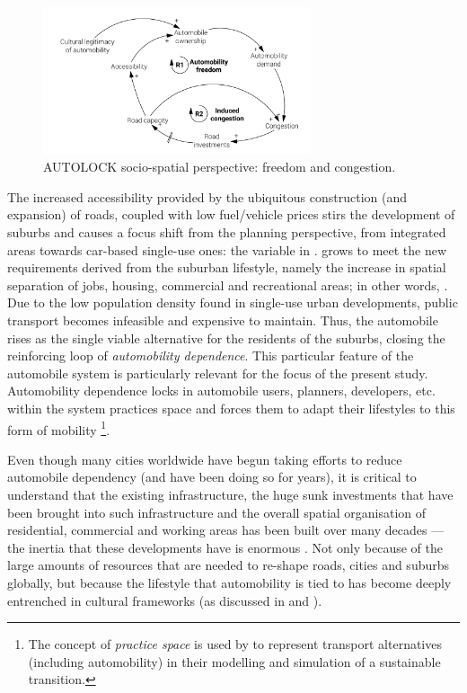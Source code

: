 \begin{figure}[h]
\centering
\includegraphics[width=0.7\textwidth]{figures/model/cropped/congestion-urban_1_core.pdf}
\caption{AUTOLOCK socio-spatial perspective: freedom and congestion.}
\label{f:results:cld_congestion_1}
\end{figure}

The increased accessibility provided by the ubiquitous construction (and expansion) of roads, coupled with low fuel/vehicle prices stirs the development of suburbs and causes a focus shift from the planning perspective, from integrated areas towards car-based single-use ones: the  variable in .  grows to meet the new requirements derived from the suburban lifestyle, namely the increase in spatial separation of jobs, housing, commercial and recreational areas; in other words, . Due to the low population density found in single-use urban developments, public transport becomes infeasible and expensive to maintain. Thus, the automobile rises as the single viable alternative for the residents of the suburbs, closing the  reinforcing loop of \emph{automobility dependence}. This particular feature of the automobile system is particularly relevant for the focus of the present study. Automobility dependence locks in automobile users, planners, developers, etc. within the system practices space and forces them to adapt their lifestyles to this form of mobility \parencite{cullinane2003_Cardependencepublic,koehler2009_transitionsmodelsustainable}\footnote{The concept of \emph{practice space} is used by \textcite{koehler2009_transitionsmodelsustainable} to represent transport alternatives (including automobility) in their modelling and simulation of a sustainable transition.}.

Even though many cities worldwide have begun taking efforts to reduce automobile dependency (and have been doing so for years), it is critical to understand that the existing infrastructure, the huge sunk investments that have been brought into such infrastructure and the overall spatial organisation of residential, commercial and working areas has been built over many decades --- the inertia that these developments have is enormous \parencite{geels2012_AutomobilityTransitionSocio}. Not only because of the large amounts of resources that are needed to re-shape roads, cities and suburbs globally, but because the lifestyle that automobility is tied to has become deeply entrenched in cultural frameworks (as discussed in  and ).

